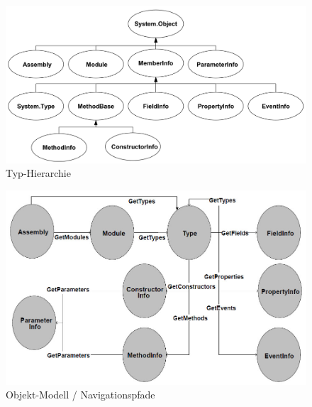 \documentclass[
a4paper,
oneside,
10pt,
fleqn,
headsepline,
toc=listofnumbered, 
bibliography=totocnumbered]{scrartcl}
\begin{document}
\begin{figure}[!ht]
	\centering
	\includegraphics[width=0.8\linewidth]{images/member_hierarchie}
	\caption{Typ-Hierarchie}
	\label{fig:valuetypes}
\end{figure}
\begin{figure}[!ht]
	\centering
	\includegraphics[width=0.8\linewidth]{images/reflection_navigation}
	\caption{Objekt-Modell / Navigationspfade}
	\label{fig:valuetypes}
\end{figure}
\end{document}
